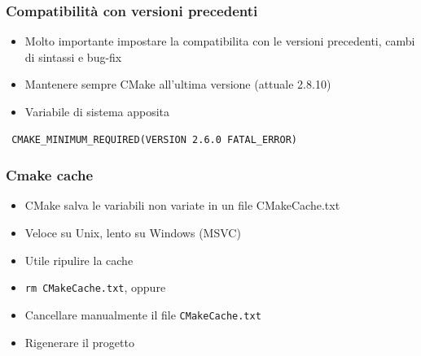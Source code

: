 \documentclass[10pt] {beamer}
\begin{document}
\begin{frame}[fragile]
\frametitle{Compatibilità con versioni precedenti}
\begin{itemize}
\item Molto importante impostare la compatibilita con le versioni precedenti, cambi di sintassi e bug-fix
\item Mantenere sempre CMake all'ultima versione (attuale 2.8.10)
\item Variabile di sistema apposita
\end{itemize}
\begin{verbatim}
 CMAKE_MINIMUM_REQUIRED(VERSION 2.6.0 FATAL_ERROR)
\end{verbatim}
\end{frame}

\begin{frame}
\frametitle{Cmake cache}
\begin{itemize}
\item CMake salva le variabili non variate in un file CMakeCache.txt
\item Veloce su Unix, lento su Windows (MSVC)
\item Utile ripulire la cache
\end{itemize}

\begin{itemize}
\item \texttt{rm CMakeCache.txt}, oppure
\item Cancellare manualmente il file \texttt{CMakeCache.txt}
\item Rigenerare il progetto
\end{itemize}

\end{frame}
\end{document}
